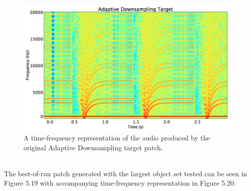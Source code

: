 \documentclass[12pt]{report} 	%
\numberwithin{figure}{chapter}
\numberwithin{table}{chapter}
\numberwithin{equation}{chapter}
\begin{document}
\begin{flushleft}
\begin{figure}[h!]
\begin{center}
\includegraphics[scale=0.35,width=\linewidth]{AdaptiveDownsamplingTargetSTFT}
\caption[Original adaptive downsampling time-frequency representation]{A time-frequency representation of the audio produced by the original Adaptive Downsampling target patch.}
\end{center}
\end{figure}
\\

The best-of-run patch generated with the largest object set tested can be seen in Figure 5.19 with accompanying time-frequency representation in Figure 5.20.


\end{flushleft}
\end{document}
